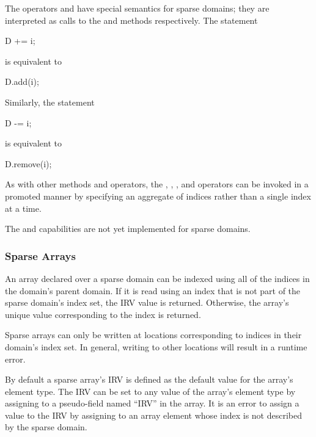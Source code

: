 The operators \chpl{+=} and \chpl{-=} have special semantics for
sparse domains; they are interpreted as calls to the 
and  methods respectively.  The statement
\begin{chapel}
D += i;
\end{chapel}
is equivalent to
\begin{chapel}
D.add(i);
\end{chapel}
Similarly, the statement
\begin{chapel}
D -= i;
\end{chapel}
is equivalent to
\begin{chapel}
D.remove(i);
\end{chapel}

As with other methods and operators, the , ,
\chpl{+=}, and \chpl{-=} operators can be invoked in a promoted manner
by specifying an aggregate of indices rather than a single index at a
time.

\begin{status}
The  and \chpl{-=} capabilities are not yet implemented
for sparse domains.
\end{status}


\subsubsection{Sparse Arrays}

An array declared over a sparse domain can be indexed using all of the
indices in the domain's parent domain.  If it is read using an index
that is not part of the sparse domain's index set, the IRV value is
returned.  Otherwise, the array's unique value corresponding to the
index is returned.

Sparse arrays can only be written at locations corresponding to
indices in their domain's index set.  In general, writing to other
locations will result in a runtime error.

By default a sparse array's IRV is defined as the default value for
the array's element type.  The IRV can be set to any value of the
array's element type by assigning to a pseudo-field named ``IRV'' in
the array.  It is an error to assign a value to the IRV by assigning
to an array element whose index is not described by the sparse domain.


